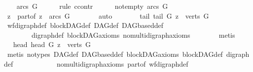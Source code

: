 \begin{isabellebody}
\ \ \isamarkupfalse%
\ {\isachardoublequoteopen}arcs\ G\ {\isacharequal}{\kern0pt}{\isacharbraceleft}{\kern0pt}{\isacharbraceright}{\kern0pt}{\isachardoublequoteclose}\ \isanewline
\ \ \isamarkupfalse%
\ {\isacharparenleft}{\kern0pt}rule\ ccontr{\isacharparenright}{\kern0pt}\isanewline
\ \ \ \ \isamarkupfalse%
\ not{\isacharunderscore}{\kern0pt}empty{\isacharcolon}{\kern0pt}\ {\isachardoublequoteopen}arcs\ G\ {\isasymnoteq}{\isacharbraceleft}{\kern0pt}{\isacharbraceright}{\kern0pt}{\isachardoublequoteclose}\ \isanewline
\ \ \ \ \isamarkupfalse%
\ \isamarkupfalse%
\ z\ \ part{\isacharunderscore}{\kern0pt}of{\isacharcolon}{\kern0pt}\ {\isachardoublequoteopen}z\ {\isasymin}\ arcs\ G{\isachardoublequoteclose}\isanewline
\ \ \ \ \ \ \isamarkupfalse%
\ auto\isanewline
\ \ \ \ \isamarkupfalse%
\ \isamarkupfalse%
\ tail{\isacharcolon}{\kern0pt}\ {\isachardoublequoteopen}tail\ G\ z\ {\isasymin}\ verts\ G{\isachardoublequoteclose}\isanewline
\ \ \ \ \ \ \isamarkupfalse%
\ wf{\isacharunderscore}{\kern0pt}digraph{\isacharunderscore}{\kern0pt}def\ blockDAG{\isacharunderscore}{\kern0pt}def\ DAG{\isacharunderscore}{\kern0pt}def\ DAGbased{\isacharunderscore}{\kern0pt}def\isanewline
\ \ \ \ \ \ \ \ digraph{\isacharunderscore}{\kern0pt}def\ blockDAG{\isacharunderscore}{\kern0pt}axioms\ nomulti{\isacharunderscore}{\kern0pt}digraph{\isachardot}{\kern0pt}axioms{\isacharparenleft}{\kern0pt}{}{\isacharparenright}{\kern0pt}\isanewline
\ \ \ \ \ \ \isamarkupfalse%
\ metis\isanewline
\ \ \ \ \isamarkupfalse%
\ \isamarkupfalse%
\ head{\isacharcolon}{\kern0pt}\ {\isachardoublequoteopen}head\ G\ z\ {\isasymin}\ verts\ G{\isachardoublequoteclose}\ \isanewline
\ \ \ \ \ \ \ \ \isamarkupfalse%
\ {\isacharparenleft}{\kern0pt}metis\ {\isacharparenleft}{\kern0pt}no{\isacharunderscore}{\kern0pt}types{\isacharparenright}{\kern0pt}\ DAG{\isacharunderscore}{\kern0pt}def\ DAGbased{\isacharunderscore}{\kern0pt}def\ blockDAG{\isacharunderscore}{\kern0pt}axioms\ blockDAG{\isacharunderscore}{\kern0pt}def\ digraph{\isacharunderscore}{\kern0pt}def\isanewline
\ \ \ \ \ \ \ \ \ \ \ \ nomulti{\isacharunderscore}{\kern0pt}digraph{\isachardot}{\kern0pt}axioms{\isacharparenleft}{\kern0pt}{}{\isacharparenright}{\kern0pt}\ part{\isacharunderscore}{\kern0pt}of\ wf{\isacharunderscore}{\kern0pt}digraph{\isacharunderscore}{\kern0pt}def{\isacharparenright}{\kern0pt}\isanewline

\end{isabellebody}
